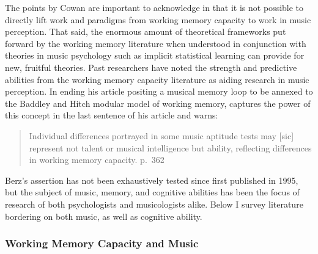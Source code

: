 \documentclass[]{book}
\begin{document}
The points by Cowan are important to acknowledge in that it is not possible to directly lift work and paradigms from working memory capacity to work in music perception.
That said, the enormous amount of theoretical frameworks put forward by the working memory literature when understood in conjunction with theories in music psychology such as implicit statistical learning \citep{saffranStatisticalLearningTone1999} can provide for new, fruitful theories.
Past researchers have noted the strength and predictive abilities from the working memory capacity literature as aiding research in music perception.
In ending his article positing a musical memory loop to be annexed to the Baddley and Hitch modular model of working memory, \citet{berzWorkingMemoryMusic1995} captures the power of this concept in the last sentence of his article and warns:

\begin{quote}
Individual differences portrayed in some music aptitude tests may {[}sic{]} represent not talent or musical intelligence but ability, reflecting differences in working memory capacity. p.~362
\end{quote}

Berz's assertion has not been exhaustively tested since first published in 1995, but the subject of music, memory, and cognitive abilities has been the focus of research of both psychologists and musicologists alike.
Below I survey literature bordering on both music, as well as cognitive ability.

\hypertarget{working-memory-capacity-and-music}{%
\subsubsection{Working Memory Capacity and Music}\label{working-memory-capacity-and-music}}
\end{document}
